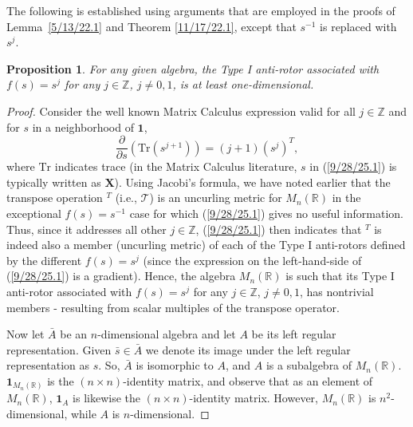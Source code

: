 \documentclass{amsart}
\newtheorem{proposition}[theorem]{Proposition}
\theoremstyle{definition}
\numberwithin{theorem}{section}
\numberwithin{equation}{section}
\begin{document}
The following is established using arguments that are employed in the proofs of \mbox{Lemma \ref{5/13/22.1}} and Theorem \ref{11/17/22.1}, except that $s^{-1}$ is replaced with $s^j$.
\begin{proposition} \label{10/25/25.5}  For any given algebra, the Type I anti-rotor associated with $f(s)=s^j$ for any $j\in\mathbb{Z}$, $j\ne 0,1$, is at least one-dimensional.\end{proposition}
\begin{proof} Consider the well known Matrix Calculus expression valid for all $j\in\mathbb{Z}$ and for $s$ in a neighborhood of $\mathbf{1}$, \begin{equation}\label{9/28/25.1} \frac{\partial}{\partial s}\left(\text{Tr}(s^{j+1})\right) = (j+1)\left(s^j\right)^T,\end{equation} where $\text{Tr}$ indicates trace (in the Matrix Calculus literature, $s$ in (\ref{9/28/25.1}) is typically written as $\mathbf{X}$). Using Jacobi's formula, we have noted earlier that the transpose operation $^T$ (i.e., $\mathcal{T}$) is an uncurling metric for $M_n(\mathbb{R})$ in the exceptional $f(s)=s^{-1}$ case for which (\ref{9/28/25.1}) gives no useful information. Thus, since it addresses all other $j\in\mathbb{Z}$, (\ref{9/28/25.1}) then indicates that $^T$ is indeed also a member (uncurling metric) of each of the Type I anti-rotors defined by the different $f(s)=s^j$ (since the expression on the left-hand-side of (\ref{9/28/25.1}) is a gradient). Hence, the algebra $M_n(\mathbb{R})$ is such that its Type I anti-rotor associated with $f(s)=s^j$ for any $j\in\mathbb{Z}$, $j\ne 0,1$, has nontrivial members - resulting from scalar multiples of the transpose operator. 

Now let $\bar{A}$ be an $n$-dimensional algebra and let $A$ be its left regular representation.  Given $\bar{s}\in\bar{A}$ we denote its image under the left regular representation as $s$.
 So, $\bar{A}$ is isomorphic to $A$, and $A$ is a subalgebra of $ M_n(\mathbb{R})$.   $\mathbf{1}_{M_n(\mathbb{R})}$ is the $(n\times n)$-identity matrix, and observe that as an element of $ M_n(\mathbb{R})$, $\mathbf{1}_A$ is likewise the $(n\times n)$-identity matrix.  However, $ M_n(\mathbb{R})$ is $n^2$-dimensional, while $A$ is $n$-dimensional.   


\end{proof}
\end{document}
